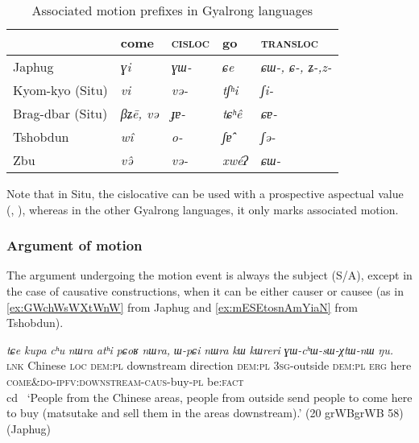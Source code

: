 \documentclass[oneside,a4paper,11pt]{article}
\newcommand{\ipa}[1]{{\phon\textit{#1}}}
\newcommand{\sens}[1]{‘#1’}
\newcommand{\rouge}[1]{{\color{red}#1}}
\begin{document}
\begin{table}[H]
\caption{Associated motion prefixes in Gyalrong languages} \centering \label{tab:am-gyalrong}
\begin{tabular}{lllll}
\toprule
&come & \textsc{cisloc} & go & \textsc{transloc} \\
\midrule
Japhug &  \ipa{ɣi} &\ipa{ɣɯ-} &\ipa{ɕe} &\ipa{ɕɯ-, ɕ-, ʑ-,z- } \\
Kyom-kyo (Situ) &\ipa{vi} &\ipa{və-} &\ipa{tʃʰi} &\ipa{ʃi-} \\
Brag-dbar (Situ) &\ipa{βʑē, və} &\ipa{ɟɐ-} &\ipa{tɕʰê} &\ipa{ɕɐ-} \\
Tshobdun & \ipa{wî}& \ipa{o-} &\ipa{ʃɐ̂} &\ipa{ʃə-} \\
Zbu & \ipa{və̂}& \ipa{və-} &\ipa{xwéʔ} &\ipa{ɕɯ-} \\
\bottomrule
\end{tabular}
\end{table}

Note that in Situ, the cislocative can be used with a prospective aspectual  value (\citealt{linyj03tense}, \citealt[204]{zhang16bragdbar}), whereas in the other Gyalrong languages, it only marks associated motion.

\subsubsection{Argument of motion}

The argument undergoing the motion event is always the subject (S/A), except in the case of causative constructions, when it can be either causer or causee (as in \ref{ex:GWchWsWXtWnW} from Japhug and \ref{ex:mESEtosnAmYiaN} from Tshobdun).

\begin{exe}
\ex \label{ex:GWchWsWXtWnW}
\gll
\ipa{tɕe} 	\ipa{kupa} 	\ipa{cʰu} 	\ipa{nɯra} 	\ipa{atʰi} 	\ipa{pɕoʁ} 	\ipa{nɯra,} 	\ipa{ɯ-pɕi} 	\ipa{nɯra} 	\ipa{kɯ} 	\ipa{kɯreri} 	\ipa{\rouge{ɣɯ}-cʰɯ-sɯ-χtɯ-nɯ} 	\ipa{ŋu.}  \\
\textsc{lnk} Chinese \textsc{loc} \textsc{dem:pl} downstream direction \textsc{dem:pl} \textsc{3sg}-outside  \textsc{dem:pl}  \textsc{erg} here \textsc{\rouge{come\&do}-ipfv:downstream-caus}-buy-\textsc{pl} be:\textsc{fact} \\cd \
\glt \sens{People from the Chinese areas, people from outside send people to come here to buy (matsutake and sell them in the areas downstream).} (20 grWBgrWB 58) (Japhug)
  \end{exe} 
\end{document}
